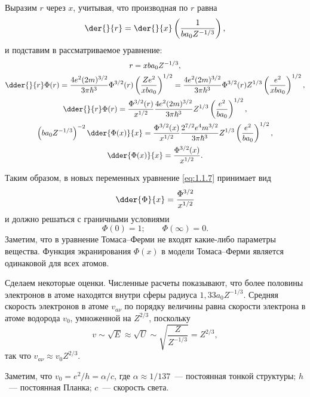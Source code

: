   Выразим \( r \) через \( x \), учитывая, что производная по \( r \) равна
  \[
    \der{}{r} = \der{}{x} \left( \frac{1}{ba_0Z^{-1 / 3}} \right),
  \]
  и подставим в рассматриваемое уравнение:
  \begin{gather*}
    r = xba_0Z^{-1 / 3}, \\
    \dder{}{r} \Phi(r) = \frac{4e^2(2m)^{3 / 2}}{3\pi\hbar^3} \Phi^{3 / 2}(r)
      \left( \frac{Ze^2}{xba_0} \right)^{1 / 2} =
      \frac{4e^2(2m)^{3 / 2}}{3\pi\hbar^3} \Phi^{3 / 2}(r) Z^{1 / 3}
      \left( \frac{e^2}{xba_0} \right)^{1 / 2}, \\
    \dder{}{r}\Phi(r) = \frac{\Phi^{3 / 2}(r)}{x^{1 / 2}}
      \frac{4e^2(2m)^{3 / 2}}{3\pi\hbar^3} Z^{1 / 3} \left( \frac{e^2}{ba_0}
      \right)^{1 / 2}, \\
    \left( ba_0Z^{-1 / 3} \right)^{-2} \dder{\Phi(x)}{x} =
      \frac{\Phi^{3 / 2}(x)}{x^{1 / 2}} \frac{2^{7 / 2} e^4 m^{3 / 2}}
      {3\pi\hbar^3} Z^{1 / 3} \left( \frac{e^2}{ba_0} \right)^{1 / 2}, \\ 
    \dder{\Phi(x)}{x} = \frac{\Phi^{3 / 2}(x)}{x^{1 / 2}}.
  \end{gather*}

  Таким образом, в новых переменных уравнение \eqref{eq:1.1.7} принимает вид
  \begin{equation}
    \dder{\Phi}{x} = \frac{\Phi^{3 / 2}}{x^{1 / 2}}
    \label{eq:1.1.8}
  \end{equation}
  и должно решаться с граничными условиями
  \begin{equation}
    \Phi(0) = 1; \qquad \Phi(\infty) = 0.
    \label{eq:1.1.9}
  \end{equation}
  Заметим, что в уравнение Томаса--Ферми не входят какие-либо параметры
  вещества. Функция экранирования \( \Phi(x) \) в модели Томаса--Ферми является
  одинаковой для всех атомов.

  Сделаем некоторые оценки. Численные расчеты показывают, что более половины
  электронов в атоме находятся внутри сферы радиуса \( 1,33a_0Z^{-1 / 3} \).
  Средняя скорость электронов в атоме \( v_{a\nu} \) по порядку величины равна
  скорости электрона в атоме водорода \( v_0 \), умноженной на \( Z^{2 / 3} \),
  поскольку 
  \[ 
    v \sim \sqrt{E} \approx \sqrt{U} \sim \sqrt{\frac{Z}{Z^{-1 / 3}}} =
    Z^{2 / 3},
  \]
  так что \( v_{a\nu} \approx v_0Z^{2 / 3} \).

  Заметим, что \( v_0 = e^2/h = \alpha / c \), где
  \( \alpha \approx 1/137 \)~--- постоянная тонкой структуры; \( h \)~---
  постоянная Планка; \( c \)~--- скорость света.

